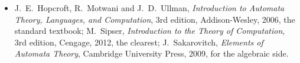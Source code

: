 \begin{itemize}
\item J.~E.~Hopcroft, R.~Motwani and J.~D.~Ullman, \emph{Introduction to Automata Theory, Languages, and Computation}, 3rd edition, Addison-Wesley, 2006, the standard textbook; M.~Sipser, \emph{Introduction to the Theory of Computation}, 3rd edition, Cengage, 2012, the clearest; J.~Sakarovitch, \emph{Elements of Automata Theory}, Cambridge University Press, 2009, for the algebraic side.
\end{itemize}
